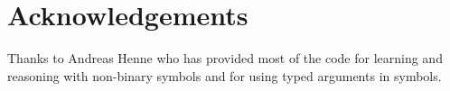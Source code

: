 \documentclass[10pt,twoside,twocolumn,fleqn]{article}
\begin{document}

\section{Acknowledgements}

Thanks to Andreas Henne who has provided most of the code for learning and
reasoning with non-binary symbols and for using typed arguments in symbols.





\end{document}
